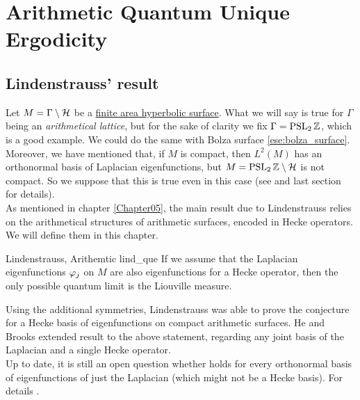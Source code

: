 
\chapter{Arithmetic Quantum Unique Ergodicity} %

\label{Chapter5} %
\thispagestyle{empty}

\section{Lindenstrauss' result}

Let $M=\Gamma\setminus\mathcal{H}$ be a \underline{finite area hyperbolic surface}. What we will say is true for $\Gamma$ being an \emph{arithmetical lattice}, but for the sake of clarity we fix $\Gamma=\operatorname{PSL}_{2}\mathbb{Z}$, which is a good example. We could do the same with Bolza surface \ref{ese:bolza_surface}. Moreover, we have mentioned that, if $M$ is compact, then $L^{2}(M)$ has an orthonormal basis of Laplacian eigenfunctions, but $M=\operatorname{PSL}_{2}\mathbb{Z}\setminus\mathcal{H}$ is not compact. So we suppose that this is true even in this case (see \cite{EinTW:AQUE} and last section for details).\\

As mentioned in chapter \ref{Chapter05}, the main result due to Lindenstrauss relies on the arithmetical structures of arithmetic surfaces, encoded in Hecke operators. We will define them in this chapter.

\begin{impTeo}{Lindenstrauss, Arithemtic \QUE}{lind_que}
If we assume that the Laplacian eigenfunctions $\varphi_{j}$ on $M$ are also eigenfunctions for a Hecke operator, then the only possible quantum limit is the Liouville measure. 
\end{impTeo}


Using the additional symmetries, Lindenstrauss was able to prove the \QUE conjecture for a Hecke basis of eigenfunctions on compact arithmetic surfaces. He and Brooks \cite{Linden:main_art} extended result to the above statement, regarding any joint basis of
the Laplacian and a single Hecke operator. \\
Up to date, it is still an open question whether \QUE holds for every orthonormal basis of eigenfunctions of just the Laplacian (which might not be a Hecke basis). For details \cite{Semyov:around_new}.

